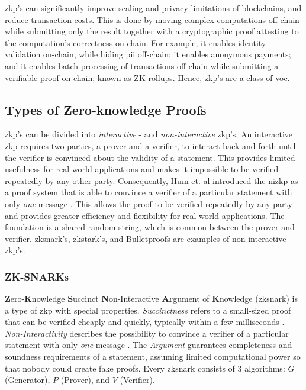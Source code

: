 \acrshort{zkp}'s can significantly improve scaling and privacy limitations of blockchains, and reduce transaction costs. This is done by moving complex computations off-chain while submitting only the result together with a cryptographic proof attesting to the computation's correctness on-chain. For example, it enables identity validation on-chain, while hiding \acrshort{pii} off-chain; it enables anonymous payments; and it enables batch processing of transactions off-chain while submitting a verifiable proof on-chain, known as ZK-rollups. Hence, \acrshort{zkp}'s are a class of \acrfull{voc}.

\subsection{Types of Zero-knowledge Proofs}
\label{subsec:zkp_req}

\acrlong{zkp}'s can be divided into \emph{interactive} - and \emph{non-interactive} \acrshort{zkp}'s. An interactive \acrshort{zkp} requires two parties, a prover and a verifier, to interact back and forth until the verifier is convinced about the validity of a statement. This provides limited usefulness for real-world applications and makes it impossible to be verified repeatedly by any other party. Consequently, Hum et. al \cite{humZeroKnowledgeItsApplications} introduced the \acrfull{nizkp} as a proof system that is able to convince a verifier of a particular statement with only \emph{one} message \cite{eberhardtOffchainingModelsApproaches2018,eberhardtZoKratesScalablePrivacyPreserving2018a,simunicVerifiableComputingApplications2021}. This allows the proof to be verified repeatedly by any party and provides greater efficiency and flexibility for real-world applications. The foundation is a shared random string, which is common between the prover and verifier. \acrshort{zksnark}'s, \acrshort{zkstark}'s, and Bulletproofs are examples of non-interactive \acrshort{zkp}'s.

\subsubsection{ZK-SNARKs}
\label{subsubsec:zksnarks}

\textbf{Z}ero-\textbf{K}nowledge \textbf{S}uccinct \textbf{N}on-Interactive \textbf{Ar}gument of \textbf{K}nowledge (\acrshort{zksnark}) is a type of \acrshort{zkp} with special properties. \emph{Succinctness} refers to a small-sized proof that can be verified cheaply and quickly, typically within a few milliseconds \cite{simunicVerifiableComputingApplications2021}. \emph{Non-Interactivity} describes the possibility to convince a verifier of a particular statement with only \emph{one} message \cite{eberhardtOffchainingModelsApproaches2018,eberhardtZoKratesScalablePrivacyPreserving2018a,simunicVerifiableComputingApplications2021}. The \emph{Argument} guarantees completeness and soundness requirements of a statement, assuming limited computational power so that nobody could create fake proofs. Every \acrshort{zksnark} consists of 3 algorithms: $G$ (Generator), $P$ (Prover), and $V$ (Verifier).

